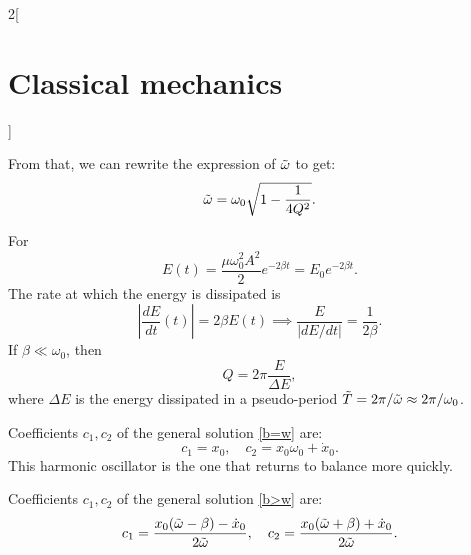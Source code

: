 \documentclass[class=article,10pt,crop=false]{standalone}
\begin{document}
\begin{multicols}{2}[\section{Classical mechanics}]
\begin{definition}
\end{definition}
\noindent From that, we can rewrite the expression of $\Tilde{\omega}$ to get: $$\Tilde{\omega}=\omega_0\sqrt{1-\frac{1}{4Q^2}}.$$
\begin{concept}
For 
$$E(t)=\frac{\mu\omega_0^2A^2}{2}e^{-2\beta t}=E_0e^{-2\beta t}.$$ The rate at which the energy is dissipated is $$\left|\frac{dE}{dt}(t)\right|=2\beta E(t)\implies\frac{E}{\left|dE/dt\right|}=\frac{1}{2\beta}.$$
If $\beta\ll\omega_0$, then $$Q=2\pi\frac{E}{\Delta E},$$ where $\Delta E$ is the energy dissipated in a pseudo-period $\Tilde{T}=2\pi/\Tilde{\omega}\approx2\pi/\omega_0$.
\end{concept}
\begin{concept}[Critically damped harmonic oscillator: $\beta=\omega_0$]
Coefficients $c_1,c_2$ of the general solution \eqref{b=w} are: $$c_1=x_0,\quad c_2=x_0\omega_0+\dot{x}_0.$$ This harmonic oscillator is the one that returns to balance more quickly.
\end{concept}
\begin{concept}
Coefficients $c_1,c_2$ of the general solution \eqref{b>w} are: $$c_1=\frac{x_0(\Tilde{\omega}-\beta)-\dot{x}_0}{2\Tilde{\omega}},\quad c_2=\frac{x_0(\Tilde{\omega}+\beta)+\dot{x}_0}{2\Tilde{\omega}}.$$
\end{concept}

\end{multicols}
\end{document}
